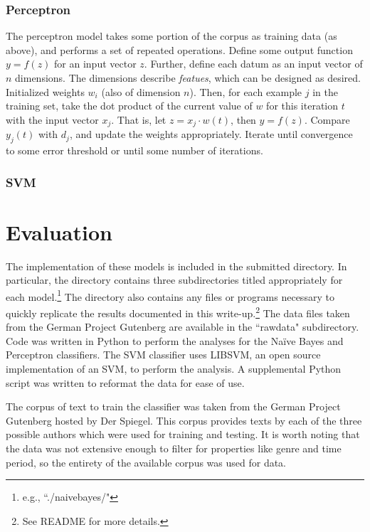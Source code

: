 \documentclass[11pt,letterpaper]{article}
\begin{document}
\subsubsection{Perceptron}
The perceptron model takes some portion of the corpus as training data (as above), and performs a set of repeated operations.  Define some output function $y = f\left(z\right)$ for an input vector $z$. Further, define each datum as an input vector of $n$ dimensions. The dimensions describe \textit{featues}, which can be designed as desired. Initialized weights $w_i$ (also of dimension $n$). Then, for each example $j$ in the training set, take the dot product of the current value of $w$ for this iteration $t$ with the input vector $x_j$. That is, let $z=x_j\cdot w\left(t\right)$, then $y=f\left(z\right)$. Compare $y_j\left(t\right)$ with $d_j$, and update the weights appropriately. Iterate until convergence to some error threshold or until some number of iterations.

\subsubsection{SVM}


\section{Evaluation}

The implementation of these models is included in the submitted directory. In particular, the directory contains three subdirectories titled appropriately for each model.\footnote{e.g., ``./naivebayes/"} The directory also contains any files or programs necessary to quickly replicate the results documented in this write-up.\footnote{See README for more details.} The data files taken from the German Project Gutenberg are available in the ``rawdata" subdirectory. Code was written in Python to perform the analyses for the Na{\"i}ve Bayes and Perceptron classifiers. The SVM classifier uses LIBSVM, an open source implementation of an SVM, to perform the analysis. A supplemental Python script was written to reformat the data for ease of use.

The corpus of text to train the classifier was taken from the German Project Gutenberg hosted by Der Spiegel. This corpus provides texts by each of the three possible authors which were used for training and testing. It is worth noting that the data was not extensive enough to filter for properties like genre and time period, so the entirety of the available corpus was used for data.
\end{document}
